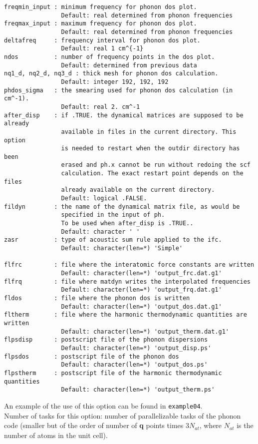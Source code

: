 \documentclass[12pt,a4paper]{article}
\begin{document}
\begin{verbatim}
freqmin_input : minimum frequency for phonon dos plot.
                Default: real determined from phonon frequencies
freqmax_input : maximum frequency for phonon dos plot.
                Default: real determined from phonon frequencies
deltafreq     : frequency interval for phonon dos plot.
                Default: real 1 cm^{-1}
ndos          : number of frequency points in the dos plot.
                Default: determined from previous data
nq1_d, nq2_d, nq3_d : thick mesh for phonon dos calculation.
                Default: integer 192, 192, 192
phdos_sigma   : the smearing used for phonon dos calculation (in cm^-1).
                Default: real 2. cm^-1
after_disp    : if .TRUE. the dynamical matrices are supposed to be already
                available in files in the current directory. This option
                is needed to restart when the outdir directory has been
                erased and ph.x cannot be run without redoing the scf 
                calculation. The exact restart point depends on the files
                already available on the current directory.
                Default: logical .FALSE.
fildyn        : the name of the dynamical matrix file, as would be 
                specified in the input of ph. 
                To be used when after_disp is .TRUE.. 
                Default: character ' '
zasr          : type of acoustic sum rule applied to the ifc.
                Default: character(len=*) 'Simple'

flfrc         : file where the interatomic force constants are written
                Default: character(len=*) 'output_frc.dat.g1'
flfrq         : file where matdyn writes the interpolated frequencies
                Default: character(len=*) 'output_frq.dat.g1'
fldos         : file where the phonon dos is written
                Default: character(len=*) 'output_dos.dat.g1'
fltherm       : file where the harmonic thermodynamic quantities are written
                Default: character(len=*) 'output_therm.dat.g1'
flpsdisp      : postscript file of the phonon dispersions
                Default: character(len=*) 'output_disp.ps'
flpsdos       : postscript file of the phonon dos
                Default: character(len=*) 'output_dos.ps'
flpstherm     : postscript file of the harmonic thermodynamic quantities
                Default: character(len=*) 'output_therm.ps'
\end{verbatim}
An example of the use of this option can be found in \texttt{example04}. \\
Number of tasks for this option: number of parallelizable tasks of the 
phonon code (smaller but of the order of number of {\bf q} points times 
$3 N_{at}$, where $N_{at}$ is the number of atoms in the unit cell).
\end{document}

